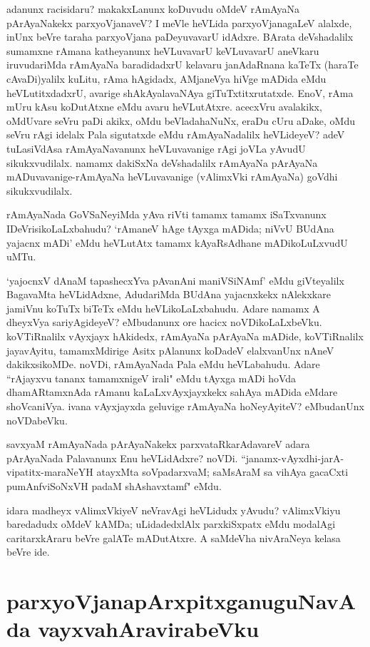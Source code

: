 adanunx racisidaru? makakxLanunx koDuvudu oMdeV rAmAyaNa pArAyaNakekx parxyoVjanaveV? I meVle heVLida parxyoVjanagaLeV alalxde, inUnx beVre taraha parxyoVjana paDeyuvavarU idAdxre. BArata deVshadalilx sumamxne rAmana katheyanunx heVLuvavarU keVLuvavarU aneVkaru iruvudariMda rAmAyaNa baradidadxrU kelavaru janAdaRnana kaTeTx (haraTe cAvaDi)yalilx kuLitu, rAma hAgidadx, AMjaneVya hiVge mADida eMdu heVLutitxdadxrU, avarige shAkAyalavaNAya giTuTxtitxrutatxde. EnoV, rAma mUru kAsu koDutAtxne eMdu avaru heVLutAtxre. acecxVru avalakikx, oMdUvare seVru paDi akikx, oMdu beVladahaNuNx, eraDu cUru aDake, oMdu seVru rAgi idelalx Pala sigutatxde eMdu rAmAyaNadalilx heVLideyeV? adeV tuLasiVdAsa rAmAyaNavanunx heVLuvavanige rAgi joVLa yAvudU sikukxvudilalx. namamx dakiSxNa deVshadalilx rAmAyaNa pArAyaNa mADuvavanige-rAmAyaNa heVLuvavanige (vAlimxVki rAmAyaNa) goVdhi sikukxvudilalx. 

rAmAyaNada GoVSaNeyiMda yAva riVti tamamx tamamx iSaTxvanunx IDeVrisikoLaLxbahudu? `rAmaneV hAge tAyxga mADida; niVvU BUdAna yajacnx mADi' eMdu heVLutAtx tamamx kAyaRsAdhane mADikoLuLxvudU uMTu. 

`yajocnxV dAnaM tapashecxYva\label{172} pAvanAni maniVSiNAmf' eMdu giVteyalilx BagavaMta heVLidAdxne, AdudariMda BUdAna yajacnxkekx nAlekxkare jamiVnu koTuTx biTeTx eMdu heVLikoLaLxbahudu. Adare namamx A dheyxVya sariyAgideyeV? eMbudanunx ore hacicx noVDikoLaLxbeVku. koVTiRnalilx vAyxjayx hAkidedx, rAmAyaNa pArAyaNa mADide, koVTiRnalilx jayavAyitu, tamamxMdirige Asitx pAlanunx koDadeV elalxvanUnx nAneV dakikxsikoMDe. noVDi, rAmAyaNada Pala eMdu heVLabahudu. Adare ``rAjayxvu tananx tamamxnigeV irali" eMdu tAyxga mADi hoVda dhamARtamxnAda rAmanu kaLaLxvAyxjayxkekx sahAya mADida eMdare shoVcaniVya. ivana vAyxjayxda geluvige rAmAyaNa hoNeyAyiteV? eMbudanUnx noVDabeVku. 


savxyaM rAmAyaNada pArAyaNakekx parxvataRkarAdavareV adara pArAyaNada Palavanunx Enu heVLidAdxre? noVDi. ``janamx-vAyxdhi-jarA-vipatitx-maraNeYH \label{173} atayxMta soVpadarxvaM; saMsAraM sa vihAya gacaCxti pumAnfviSoNxVH padaM shAshavxtamf" eMdu. 


idara madheyx vAlimxVkiyeV neVravAgi heVLidudx yAvudu? vAlimxVkiyu baredadudx oMdeV kAMDa; uLidadedxlAlx parxkiSxpatx eMdu modalAgi caritarxkAraru beVre galATe mADutAtxre. A saMdeVha nivAraNeya kelasa beVre ide. 


\section*{parxyoVjanapArxpitxganuguNavAda vayxvahAravirabeVku} 


